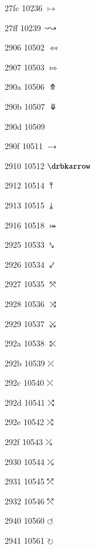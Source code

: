 \documentclass[11pt]{article}
\begin{document}
27fc 10236 \ensuremath{\longmapsto}

27ff 10239 \ensuremath{\sim\joinrel\leadsto}


2906 10502 \ensuremath{\Mapsfrom}

2907 10503 \ensuremath{\Mapsto}

290a 10506 \ensuremath{\Uuparrow}

290b 10507 \ensuremath{\Ddownarrow}

290d 10509 \bkarow

290f 10511 \ensuremath{\dbkarow}

2910 10512 \ensuremath{\drbkarrow}

2912 10514 \ensuremath{\UpArrowBar}

2913 10515 \ensuremath{\DownArrowBar}

2916 10518 \ensuremath{\twoheadrightarrowtail}



2925 10533 \ensuremath{\hksearow}

2926 10534 \ensuremath{\hkswarow}

2927 10535 \ensuremath{\tona}

2928 10536 \ensuremath{\toea}

2929 10537 \ensuremath{\tosa}

292a 10538 \ensuremath{\towa}

292b 10539 \ensuremath{\rdiagovfdiag}

292c 10540 \ensuremath{\fdiagovrdiag}

292d 10541 \ensuremath{\seovnearrow}

292e 10542 \ensuremath{\neovsearrow}

292f 10543 \ensuremath{\fdiagovnearrow}

2930 10544 \ensuremath{\rdiagovsearrow}

2931 10545 \ensuremath{\neovnwarrow}

2932 10546 \ensuremath{\nwovnearrow}




2940 10560 \ensuremath{\circlearrowleft}

2941 10561 \ensuremath{\circlearrowright}
\end{document}
